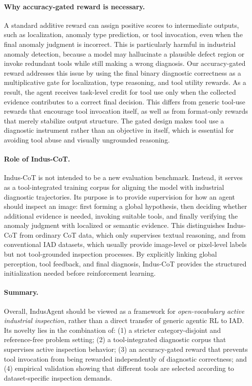 \documentclass{llmxive}
\begin{document}
{\paragraph{Why accuracy-gated reward is necessary.}
A standard additive reward can assign positive scores to intermediate outputs, such as localization, anomaly type prediction, or tool invocation, even when the final anomaly judgment is incorrect. 
This is particularly harmful in industrial anomaly detection, because a model may hallucinate a plausible defect region or invoke redundant tools while still making a wrong diagnosis. 
Our accuracy-gated reward addresses this issue by using the final binary diagnostic correctness as a multiplicative gate for localization, type reasoning, and tool utility rewards. 
As a result, the agent receives task-level credit for tool use only when the collected evidence contributes to a correct final decision. 
This differs from generic tool-use rewards that encourage tool invocation itself, as well as from format-only rewards that merely stabilize output structure. 
The gated design makes tool use a diagnostic instrument rather than an objective in itself, which is essential for avoiding tool abuse and visually ungrounded reasoning.

\paragraph{Role of Indus-CoT.}
Indus-CoT is not intended to be a new evaluation benchmark. 
Instead, it serves as a tool-integrated training corpus for aligning the model with industrial diagnostic trajectories. 
Its purpose is to provide supervision for how an agent should inspect an image: first forming a global hypothesis, then deciding whether additional evidence is needed, invoking suitable tools, and finally verifying the anomaly judgment with localized or semantic evidence. 
This distinguishes Indus-CoT from ordinary CoT data, which only supervises textual reasoning, and from conventional IAD datasets, which usually provide image-level or pixel-level labels but not tool-grounded inspection processes. 
By explicitly linking global perception, tool feedback, and final diagnosis, Indus-CoT provides the structured initialization needed before reinforcement learning.

\paragraph{Summary.}
Overall, IndusAgent should be viewed as a framework for \emph{open-vocabulary active industrial inspection}, rather than a direct transfer of generic agentic RL to IAD. 
Its novelty lies in the combination of: 
(1) a stricter category-disjoint and reference-free problem setting; 
(2) a tool-integrated diagnostic corpus that supervises active inspection behavior; 
(3) an accuracy-gated reward that prevents tool invocation from being rewarded independently of diagnostic correctness; and 
(4) empirical validation showing that different tools are selected according to dataset-specific inspection demands. 



}
\end{document}
